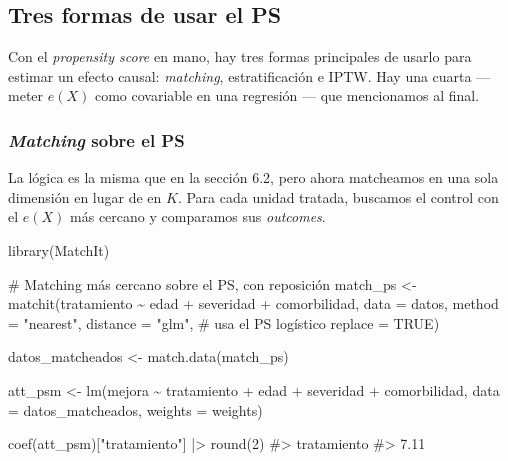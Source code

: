 \documentclass[
  letterpaper,
  DIV=11,
  numbers=noendperiod,
  oneside]{scrreprt}
\newenvironment{Shaded}{\begin{snugshade}}{\end{snugshade}}
\newcommand{\AttributeTok}[1]{\textcolor[rgb]{0.40,0.45,0.13}{#1}}
\newcommand{\CommentTok}[1]{\textcolor[rgb]{0.37,0.37,0.37}{#1}}
\newcommand{\ConstantTok}[1]{\textcolor[rgb]{0.56,0.35,0.01}{#1}}
\newcommand{\DecValTok}[1]{\textcolor[rgb]{0.68,0.00,0.00}{#1}}
\newcommand{\FunctionTok}[1]{\textcolor[rgb]{0.28,0.35,0.67}{#1}}
\newcommand{\NormalTok}[1]{\textcolor[rgb]{0.00,0.23,0.31}{#1}}
\newcommand{\OtherTok}[1]{\textcolor[rgb]{0.00,0.23,0.31}{#1}}
\newcommand{\SpecialCharTok}[1]{\textcolor[rgb]{0.37,0.37,0.37}{#1}}
\newcommand{\StringTok}[1]{\textcolor[rgb]{0.13,0.47,0.30}{#1}}
\begin{document}
\hypertarget{tres-formas-de-usar-el-ps}{%
\subsection{Tres formas de usar el PS}\label{tres-formas-de-usar-el-ps}}

Con el \emph{propensity score} en mano, hay tres formas principales de
usarlo para estimar un efecto causal: \emph{matching}, estratificación e
IPTW. Hay una cuarta --- meter \(e(X)\) como covariable en una regresión
--- que mencionamos al final.

\hypertarget{matching-sobre-el-ps}{%
\subsubsection{\texorpdfstring{\emph{Matching} sobre el
PS}{Matching sobre el PS}}\label{matching-sobre-el-ps}}

La lógica es la misma que en la sección 6.2, pero ahora matcheamos en
una sola dimensión en lugar de en \(K\). Para cada unidad tratada,
buscamos el control con el \(e(X)\) más cercano y comparamos sus
\emph{outcomes}.

\begin{Shaded}
\begin{Highlighting}[]
\FunctionTok{library}\NormalTok{(MatchIt)}

\CommentTok{\# Matching más cercano sobre el PS, con reposición}
\NormalTok{match\_ps }\OtherTok{\textless{}{-}} \FunctionTok{matchit}\NormalTok{(tratamiento }\SpecialCharTok{\textasciitilde{}}\NormalTok{ edad }\SpecialCharTok{+}\NormalTok{ severidad }\SpecialCharTok{+}\NormalTok{ comorbilidad,}
                    \AttributeTok{data     =}\NormalTok{ datos,}
                    \AttributeTok{method   =} \StringTok{"nearest"}\NormalTok{,}
                    \AttributeTok{distance =} \StringTok{"glm"}\NormalTok{,   }\CommentTok{\# usa el PS logístico}
                    \AttributeTok{replace  =} \ConstantTok{TRUE}\NormalTok{)}

\NormalTok{datos\_matcheados }\OtherTok{\textless{}{-}} \FunctionTok{match.data}\NormalTok{(match\_ps)}

\NormalTok{att\_psm }\OtherTok{\textless{}{-}} \FunctionTok{lm}\NormalTok{(mejora }\SpecialCharTok{\textasciitilde{}}\NormalTok{ tratamiento }\SpecialCharTok{+}\NormalTok{ edad }\SpecialCharTok{+}\NormalTok{ severidad }\SpecialCharTok{+}\NormalTok{ comorbilidad,}
              \AttributeTok{data    =}\NormalTok{ datos\_matcheados,}
              \AttributeTok{weights =}\NormalTok{ weights)}

\FunctionTok{coef}\NormalTok{(att\_psm)[}\StringTok{"tratamiento"}\NormalTok{] }\SpecialCharTok{|\textgreater{}} \FunctionTok{round}\NormalTok{(}\DecValTok{2}\NormalTok{)}
\CommentTok{\#\textgreater{} tratamiento }
\CommentTok{\#\textgreater{}        7.11}
\end{Highlighting}
\end{Shaded}
\end{document}
